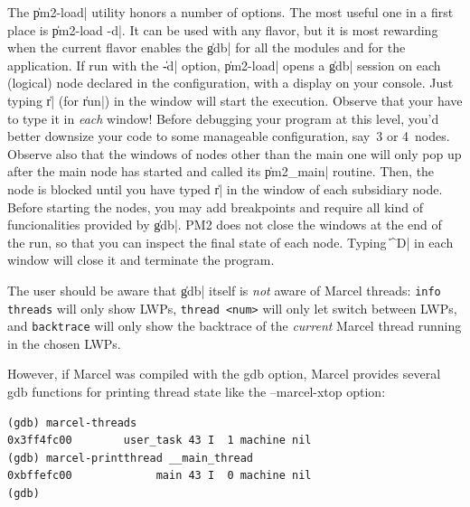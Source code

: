 The \|pm2-load| utility honors a number of options.  The most useful
one in a first place is \|pm2-load -d|. It can be used with any flavor,
but it is most rewarding when the current flavor enables the \|gdb|
for all the modules and for the application. If run with the \|-d|
option, \|pm2-load| opens a \|gdb| session on each (logical) node
declared in the configuration, with a display on your console. Just
typing \|r| (for \|run|) in the window will start the execution.
Observe that your have to type it in \emph{each} window!  Before
debugging your program at this level, you'd better downsize your code
to some manageable configuration, say~3 or 4~nodes. Observe also that
the windows of nodes other than the main one will only pop up after
the main node has started and called its \|pm2_main| routine. Then,
the node is blocked until you have typed \|r| in the window of each
subsidiary node. Before starting the nodes, you may add breakpoints
and require all kind of funcionalities provided by \|gdb|.  PM2 does
not close the windows at the end of the run, so that you can inspect
the final state of each node. Typing \|^D| in each window will close
it and terminate the program.


The user should be aware that \|gdb| itself is \emph{not} aware
of Marcel threads: \texttt{info threads} will only show LWPs,
\texttt{thread <num>} will only let switch between LWPs, and
\texttt{backtrace} will only show the backtrace of the \emph{current}
Marcel thread running in the chosen LWPs.

However, if Marcel was compiled with the gdb option, Marcel provides
several gdb functions for printing thread state like the --marcel-xtop
option:
\begin{verbatim}
(gdb) marcel-threads
0x3ff4fc00        user_task 43 I  1 machine nil
(gdb) marcel-printthread __main_thread
0xbffefc00             main 43 I  0 machine nil
(gdb)
\end{verbatim}

